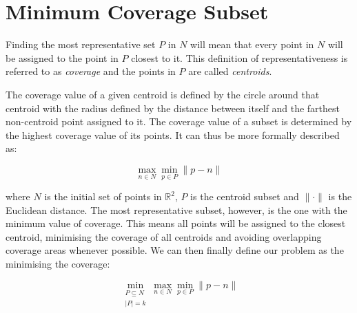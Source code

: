\section{Minimum Coverage Subset}


Finding the most representative set $P$ in $N$ will mean that every point in $N$ will be assigned to the point in $P$ closest to it. This definition of representativeness is referred to as \emph{coverage} and the points in $P$ are called \emph{centroids}.

The coverage value of a given centroid is defined by the circle around that centroid with the radius defined by the distance between itself and the farthest non-centroid point assigned to it. The coverage value of a subset is determined by the highest coverage value of its points. It can thus be more formally described as:

\begin{equation}
\max_{n \in N}
	{\min_{p \in P}
		{\lVert p-n \rVert}
	}
\end{equation}

\noindent
where $N$ is the initial set of points in $\mathbb{R}^2$, $P$ is the centroid subset and $\lVert \cdot \rVert $ is the Euclidean distance.
The most representative subset, however, is the one with the minimum value of coverage. This means all points will be assigned to the closest centroid, minimising the coverage of all centroids and avoiding overlapping coverage areas whenever possible.
We can then finally define our problem as the minimising the coverage:

\begin{equation}
\min_{\substack{P \subseteq N\\ \lvert P \rvert = k}}{\max_{n \in N}{\min_{p \in P}{\lVert p-n \rVert}}}
\end{equation}


